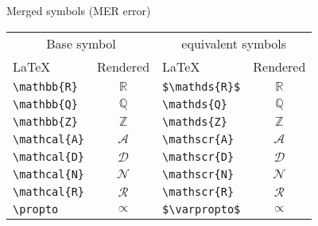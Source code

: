\begin{frame}[fragile]{Merged symbols (MER error)}
\begin{table}[ht]
    \centering
    \begin{tabular}{lc|lc}
        \toprule
        \multicolumn{2}{c}{Base symbol} & \multicolumn{2}{c}{equivalent symbols}\\
        \LaTeX         & Rendered       & \LaTeX                 & Rendered  \\\midrule
        \verb+\mathbb{R}+ & $\mathbb{R}$ & \verb+$\mathds{R}$+   & $\mathds{R}$\\
        \verb+\mathbb{Q}+ & $\mathbb{Q}$ & \verb+\mathds{Q}+     & $\mathds{Q}$\\
        \verb+\mathbb{Z}+ & $\mathbb{Z}$ & \verb+\mathds{Z}+     & $\mathds{Z}$\\
        \verb+\mathcal{A}+ & $\mathcal{A}$ & \verb+\mathscr{A}+  & $\mathscr{A}$\\
        \verb+\mathcal{D}+ & $\mathcal{D}$ & \verb+\mathscr{D}+  & $\mathscr{D}$\\
        \verb+\mathcal{N}+ & $\mathcal{N}$ & \verb+\mathscr{N}+  & $\mathscr{N}$\\
        \verb+\mathcal{R}+ & $\mathcal{R}$ & \verb+\mathscr{R}+  & $\mathscr{R}$\\
        \verb+\propto+ & $\propto$      & \verb+$\varpropto$+    & $\varpropto$\\
        \bottomrule
    \end{tabular}
\end{table}
\end{frame}


